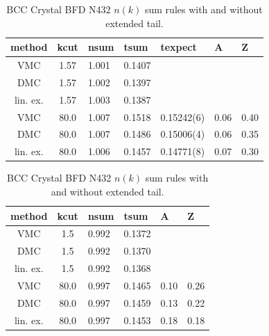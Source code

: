 \documentclass[aps,prl,superscriptaddress]{revtex4-1}
\newcommand{\midrule}{\hline}
\newcommand{\bottomrule}{\hline\hline}
\begin{document}
\begin{table}[h]
\caption{Perfect crystal spherically-averaged momentum distribution sum rules and tail. \label{tab:crystal-ntsum}}
\begin{subtable}{0.49\textwidth}
\caption{BCC Crystal BFD N54 $n(k)$ sum rules with and without extended tail.\label{tab:solid-bfd-n54-sum02}}
\begin{tabular}{cclllll}
\toprule
method & kcut & nsum & tsum & texpect & A & Z \\
\midrule
VMC & 1.57 & 1.001 & 0.1407 \\
DMC & 1.57 & 1.002 & 0.1397 \\
lin. ex. & 1.57 & 1.003 & 0.1387 \\
VMC & 80.0 & 1.007 & 0.1518 & 0.15242(6) & 0.06 & 0.40 \\
DMC & 80.0 & 1.007 & 0.1486 & 0.15006(4) & 0.06 & 0.35 \\
lin. ex. & 80.0 & 1.006 & 0.1457 & 0.14771(8) & 0.07 & 0.30 \\
\bottomrule
\end{tabular}
\end{subtable}
\begin{subtable}{0.49\textwidth}
\caption{BCC Crystal BFD N432 $n(k)$ sum rules with and without extended tail.\label{tab:solid-bfd-n432-sum02}}
\begin{tabular}{ccllll}
\toprule
method & kcut & nsum & tsum & A & Z \\
\midrule
VMC & 1.5 & 0.992 & 0.1372 \\
DMC & 1.5 & 0.992 & 0.1370 \\
lin. ex. & 1.5 & 0.992 & 0.1368 \\
VMC & 80.0 & 0.997 & 0.1465 & 0.10 & 0.26 \\
DMC & 80.0 & 0.997 & 0.1459 & 0.13 & 0.22 \\
lin. ex. & 80.0 & 0.997 & 0.1453 & 0.18 & 0.18 \\ 
\bottomrule
\end{tabular}
\end{subtable}
\end{table}
\end{document}
